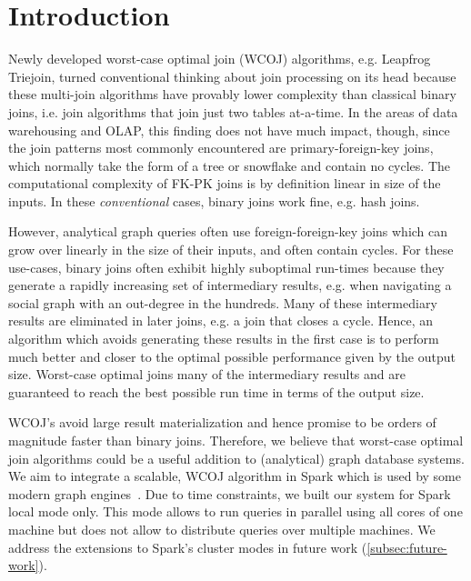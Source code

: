 \section{Introduction} \label{sec:introduction}
Newly developed worst-case optimal join (WCOJ) algorithms, e.g. Leapfrog Triejoin, turned conventional thinking about join processing
on its head because these multi-join algorithms have provably lower complexity than classical binary joins,
i.e. join algorithms that join just two tables at-a-time.
In the areas of data warehousing and OLAP, this finding does not have much impact, though,
since the join patterns most commonly encountered are primary-foreign-key joins,
which normally take the form of a tree or snowflake and contain no cycles.
The computational complexity of FK-PK joins is by definition linear in size of the inputs.
In these \textit{conventional} cases, binary joins work fine, e.g. hash joins.

However, analytical graph queries often use foreign-foreign-key joins which can grow over linearly in the size of their inputs,
and often contain cycles.
For these use-cases, binary joins often exhibit highly suboptimal run-times because they generate a rapidly increasing set of
intermediary results, e.g. when navigating a social graph with an out-degree in the hundreds.
Many of these intermediary results are eliminated in later joins, e.g. a join that closes a cycle.
Hence, an algorithm which avoids generating these results in the first case is to perform much better and
closer to the optimal possible performance given by the output size.
Worst-case optimal joins many of the intermediary results and are guaranteed to reach the best possible run time in terms of
the output size.

\textsc{WCOJ}'s avoid large result materialization and hence promise to be orders of magnitude faster than binary
joins.
Therefore, we believe that worst-case optimal join algorithms could be a useful addition to (analytical) graph database systems.
We aim to integrate a scalable, \textsc{WCOJ} algorithm in Spark which is used by some modern graph engines~\cite{caps,g-core,graphFrame}.
Due to time constraints, we built our system for Spark local mode only.
This mode allows to run queries in parallel using all cores of one machine but does not allow to distribute queries over multiple machines.
We address the extensions to Spark's cluster modes in future work (\cref{subsec:future-work}).

